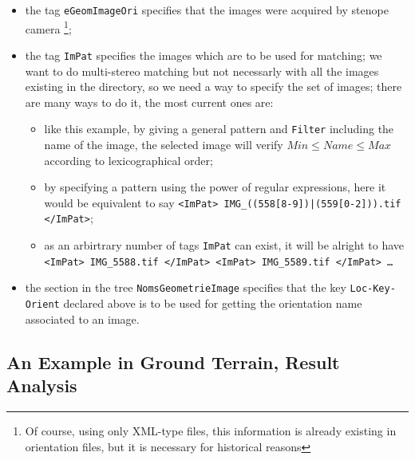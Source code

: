 \begin{itemize}
   \item the tag {\tt eGeomImageOri} specifies that the images were acquired by stenope
         camera \footnote{Of course, using only XML-type files, this information is already
         existing in orientation files, but it is necessary for historical reasons};

    \item the tag {\tt ImPat} specifies the images which are to be used for matching; we want
          to do multi-stereo matching but not necessarly with all the images existing in the
          directory, so we need a way to specify the set of images; there are many ways to
          do it, the most current ones are:

\begin{itemize}
        \item like this example, by giving a general pattern and {\tt Filter} including the name
              of the image, the selected image will verify $Min \leq Name \leq Max$ according
              to lexicographical order;
        \item by specifying a pattern using the power of regular expressions, here it would be
              equivalent to say {\tt <ImPat> IMG\_((558[8-9])|(559[0-2])).tif </ImPat>};
        \item as an arbirtrary number of tags {\tt ImPat} can exist, it will be alright to
             have {\tt <ImPat> IMG\_5588.tif </ImPat> <ImPat> IMG\_5589.tif </ImPat> \dots}

\end{itemize}

    \item the section in the tree {\tt NomsGeometrieImage} specifies that the key {\tt Loc-Key-Orient}
          declared above is to be used for getting the orientation name associated to an image.

\end{itemize}




\subsection{An Example in Ground Terrain, Result Analysis}

\label{Ex:GrTer:RA}

